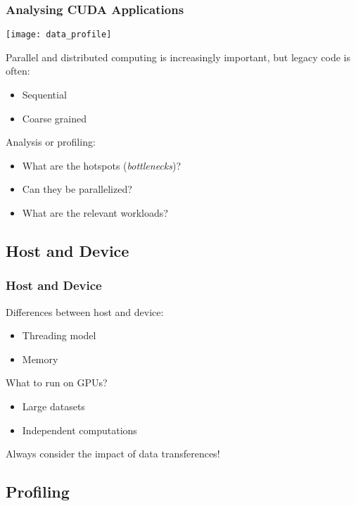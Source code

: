 \documentclass[10pt, compress]{beamer}
\begin{document}
\begin{frame}
    \frametitle{Analysing CUDA Applications}
    \begin{center}
        \texttt{[image: data\_profile]}
    \end{center}

    \alert{Parallel} and \alert{distributed} computing is
    increasingly important, but \alert{legacy code} is often:
    \pause
    \begin{itemize}
        \item \alert{Sequential}
            \pause
        \item \alert{Coarse grained}
    \end{itemize}
    \pause

    Analysis or \alert{profiling}:
    \pause
    \begin{itemize}
        \item What are the \alert{hotspots} (\textit{bottlenecks})?
            \pause
        \item Can they be parallelized?
            \pause
        \item What are the relevant \alert{workloads}?
    \end{itemize}
\end{frame}

\subsection{Host and Device}

\begin{frame}
    \frametitle{Host and Device}
    Differences between host and device:
    \begin{itemize}
        \item Threading model
            \pause
        \item Memory
    \end{itemize}

    \pause
    What to run on \alert{GPUs}?
    \pause
    \begin{itemize}
        \item Large \alert{datasets}
            \pause
        \item \alert{Independent} computations
    \end{itemize}
    \pause

    Always consider the impact of \alert{data transferences}!
\end{frame}

\subsection{Profiling}
\end{document}
